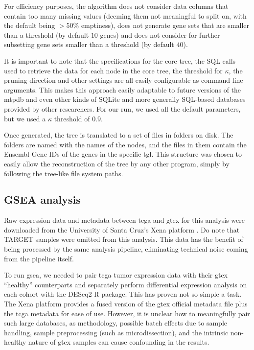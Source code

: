 For efficiency purposes, the algorithm does not consider data columns that contain too many missing values (deeming them not meaningful to split on, with the default being $> 50\%$ emptiness), does not generate gene sets that are smaller than a threshold (by default $10$ genes) and does not consider for further subsetting gene sets smaller than a threshold (by default $40$).

It is important to note that the specifications for the core tree, the SQL calls used to retrieve the data for each node in the core tree, the threshold for $\kappa$, the pruning direction and other settings are all easily configurable as command-line arguments.
This makes this approach easily adaptable to future versions of the \gls{mtpdb} and even other kinds of SQLite and more generally SQL-based databases provided by other researchers.
For our run, we used all the default parameters, but we used a $\kappa$ threshold of $0.9$.

Once generated, the tree is translated to a set of files in folders on disk. The folders are named with the names of the nodes, and the  files in them contain the Ensembl Gene IDs of the genes in the specific \gls{tgl}. This structure was chosen to easily allow the reconstruction of the tree by any other program, simply by following the tree-like file system paths.

\subsection{GSEA analysis}

Raw expression data and metadata between \gls{tcga} and \gls{gtex} for this analysis were downloaded from the University of Santa Cruz's Xena platform \cite{UCSCXena}.
Do note that TARGET samples were omitted from this analysis.
This data has the benefit of being processed by the same analysis pipeline, eliminating technical noise coming from the pipeline itself.

To run \gls{gsea}, we needed to pair \gls{tcga} tumor expression data with their \gls{gtex} ``healthy'' counterparts and separately perform differential expression analysis on each cohort with the DESeq2 R package.
This has proven not so simple a task.
The Xena platform provides a fused version of the \gls{gtex} official metadata file plus the \gls{tcga} metadata for ease of use.
However, it is unclear how to meaningfully pair such large databases, as methodology, possible batch effects due to sample handling, sample preprocessing (such as microdissection), and the intrinsic non-healthy nature of \gls{gtex} samples can cause confounding in the results.

